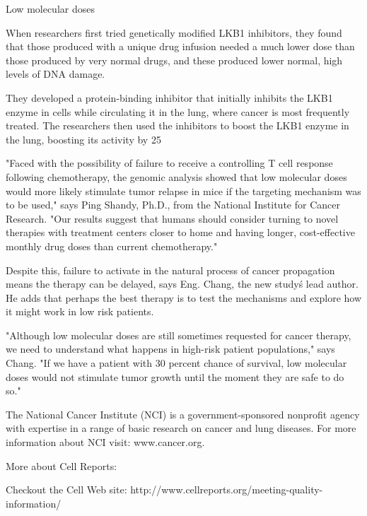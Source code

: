 \documentclass{article}
\begin{document}
Low molecular doses

When researchers first tried genetically modified LKB1 inhibitors, they found that those produced with a unique drug infusion needed a much lower dose than those produced by very normal drugs, and these produced lower normal, high levels of DNA damage.

They developed a protein-binding inhibitor that initially inhibits the LKB1 enzyme in cells while circulating it in the lung, where cancer is most frequently treated. The researchers then used the inhibitors to boost the LKB1 enzyme in the lung, boosting its activity by 25%

"Faced with the possibility of failure to receive a controlling T cell response following chemotherapy, the genomic analysis showed that low molecular doses would more likely stimulate tumor relapse in mice if the targeting mechanism was to be used," says Ping Shandy, Ph.D., from the National Institute for Cancer Research. "Our results suggest that humans should consider turning to novel therapies with treatment centers closer to home and having longer, cost-effective monthly drug doses than current chemotherapy."

Despite this, failure to activate in the natural process of cancer propagation means the therapy can be delayed, says Eng. Chang, the new study\'s lead author. He adds that perhaps the best therapy is to test the mechanisms and explore how it might work in low risk patients.

"Although low molecular doses are still sometimes requested for cancer therapy, we need to understand what happens in high-risk patient populations," says Chang. "If we have a patient with 30 percent chance of survival, low molecular doses would not stimulate tumor growth until the moment they are safe to do so."

The National Cancer Institute (NCI) is a government-sponsored nonprofit agency with expertise in a range of basic research on cancer and lung diseases. For more information about NCI visit: www.cancer.org.

More about Cell Reports:

Checkout the Cell Web site: http://www.cellreports.org/meeting-quality-information/
\end{document}
